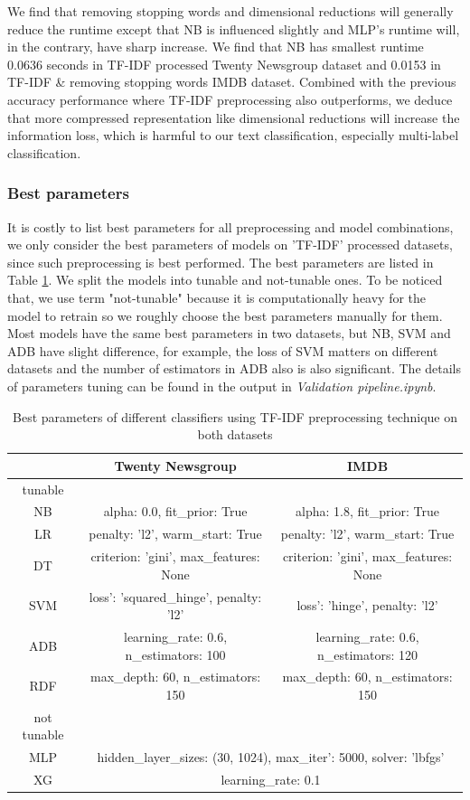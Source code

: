 \documentclass[11pt]{scrartcl}
\begin{document}
We find that removing stopping words and dimensional reductions will generally reduce the runtime except that NB is influenced slightly and MLP's runtime will, in the contrary, have sharp increase. We find that NB has smallest runtime 0.0636 seconds in TF-IDF processed Twenty Newsgroup dataset and 0.0153 in TF-IDF \& removing stopping words IMDB dataset. Combined with the previous accuracy performance where TF-IDF preprocessing also outperforms, we deduce that more compressed representation like dimensional reductions will increase the information loss, which is harmful to our text classification, especially multi-label classification.

\subsubsection*{Best parameters}
It is costly to list best parameters for all preprocessing and model combinations, we only consider the best parameters of models on 'TF-IDF' processed datasets, since such preprocessing is best performed. The best parameters are listed in Table \ref{params}. We split the models into tunable and not-tunable ones. To be noticed that, we use term "not-tunable" because it is computationally heavy for the model to retrain so we roughly choose the best parameters manually for them. Most models have the same best parameters in two datasets, but NB, SVM and ADB have slight difference, for example, the loss of SVM matters on different datasets and the number of estimators in ADB also is also significant. The details of parameters tuning can be found in the output in \textit{Validation pipeline.ipynb}.

\begin{table}[H]
    \centering
    \begin{tabular}{c|cc}
        \hline
         &  Twenty Newsgroup  &  IMDB  \\
		\hline
		tunable & & \\
		\hline
        NB & alpha: 0.0, fit\_prior: True & alpha: 1.8, fit\_prior: True \\
		LR & penalty: 'l2', warm\_start: True & penalty: 'l2', warm\_start: True \\
		DT & criterion: 'gini', max\_features: None & criterion: 'gini', max\_features: None \\
		SVM & loss': 'squared\_hinge', penalty: 'l2' & loss': 'hinge', penalty: 'l2'\\
		ADB & learning\_rate: 0.6, n\_estimators: 100 & learning\_rate: 0.6, n\_estimators: 120 \\
		RDF & max\_depth: 60, n\_estimators: 150 & max\_depth: 60, n\_estimators: 150 \\
		\hline
		not tunable & & \\
		\hline
		MLP &  \multicolumn{2}{c}{hidden\_layer\_sizes: (30, 1024), max\_iter': 5000, solver: 'lbfgs' }  \\
		XG & \multicolumn{2}{c}{learning\_rate: 0.1}  \\
        \hline
    \end{tabular} 
    \caption{Best parameters of different classifiers using TF-IDF preprocessing technique on both datasets}
    \label{params}
\end{table}
\end{document}

